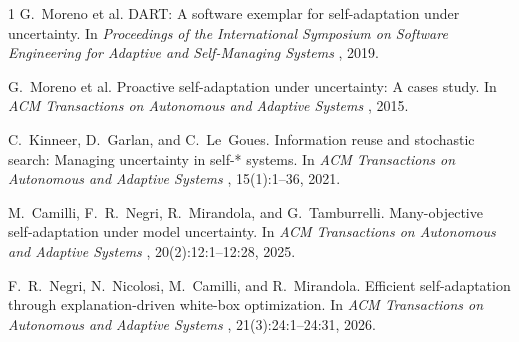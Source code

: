 \documentclass[oneside,openany,a4paper,12pt,draft]{article}
\begin{document}

\begin{thebibliography}{1}
G.~Moreno et al.
\newblock DART: A software exemplar for self-adaptation under uncertainty.
\newblock In {\em Proceedings of the International Symposium on Software Engineering for Adaptive and Self-Managing Systems }, 2019.

G.~Moreno et al.
\newblock Proactive self-adaptation under uncertainty: A cases study.
\newblock In {\em ACM Transactions on Autonomous and Adaptive Systems }, 2015.

C.~Kinneer, D.~Garlan, and C.~Le~Goues.
\newblock Information reuse and stochastic search: Managing uncertainty in self-* systems.
\newblock In {\em ACM Transactions on Autonomous and Adaptive Systems }, 15(1):1--36, 2021.

M.~Camilli, F.~R.~Negri, R.~Mirandola, and G.~Tamburrelli.
\newblock Many-objective self-adaptation under model uncertainty.
\newblock In {\em ACM Transactions on Autonomous and Adaptive Systems }, 20(2):12:1--12:28, 2025.

F.~R.~Negri, N.~Nicolosi, M.~Camilli, and R.~Mirandola.
\newblock Efficient self-adaptation through explanation-driven white-box optimization.
\newblock In {\em ACM Transactions on Autonomous and Adaptive Systems }, 21(3):24:1--24:31, 2026.
\end{thebibliography}
\end{document}
